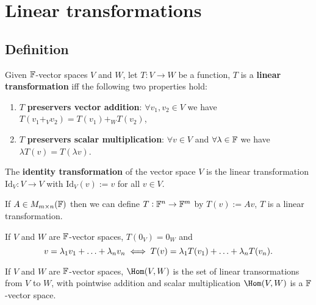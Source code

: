 \documentclass[../Year1/Year1.tex]{subfiles}
\begin{document}
\section{Linear transformations}

\subsection{Definition}

\begin{definition}
    Given $\mathbb{F}$-vector spaces $V$ and $W$, let $T:V \rightarrow W$ be a function, $T$ is a \textbf{linear transformation} iff the following two properties hold: \begin{enumerate}
        \item $T$ \textbf{preservers vector addition}: $\forall v_1,v_2\in V$ we have $T(v_1 +_V v_2) = T(v_1) +_W T(v_2)$,
        \item $T$ \textbf{preservers scalar multiplication}: $\forall v\in V$ and  $\forall \lambda \in \mathbb{F}$ we have $\lambda T(v) = T(\lambda v)$.
    \end{enumerate} 
\end{definition}

\begin{definition}
    The \textbf{identity transformation} of the vector space $V$ is the linear transformation $\text{Id}_V: V\rightarrow V$ with $\text{Id}_V(v):=v$ for all $v\in V$.
\end{definition}

\begin{definition}
    If $A\in M_{m\times n}(\mathbb{F})$ then we can define $T:\mathbb{F}^n \rightarrow \mathbb{F}^m$ by $T(v):=Av$, $T$ is a linear transformation.
\end{definition}

\begin{theorem}
    If $V$ and $W$ are $\mathbb{F}$-vector spaces, $T(0_V) = 0_W$ and \[
        v = \lambda_1v_1 + \ldots + \lambda_nv_n \iff T(v) = \lambda_1T(v_1) + \ldots + \lambda_nT(v_n)
        \textcolor{black}{.}
    \]
\end{theorem}

\begin{theorem}
    If $V$ and $W$ are $\mathbb{F}$-vector spaces, $\Hom(V,W)$ is the set of linear transormations from $V$ to $W$, with pointwise addition and scalar multiplication $\Hom(V,W)$ is a $\mathbb{F}$-vector space.
\end{theorem}
\end{document}
